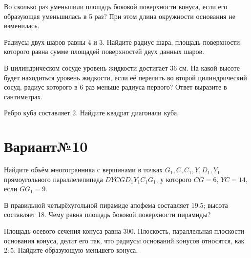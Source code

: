 \documentclass[4apaper]{article}
\begin{document}
\begin{taskBN}{3}
Во сколько раз уменьшили площадь боковой поверхности конуса, если его образующая уменьшилась в 5 раз? При этом длина окружности основания не изменилась.
\end{taskBN}

\begin{taskBN}{4}
Радиусы двух шаров равны $4$ и $3$. Найдите радиус шара, площадь поверхности которого равна сумме площадей поверхностей двух данных шаров.
\end{taskBN}

\begin{taskBN}{5}
В цилиндрическом сосуде уровень жидкости достигает 36 см. На какой высоте будет находиться уровень жидкости, если её перелить во второй цилиндрический сосуд, радиус которого в 6 раз меньше радиуса первого? Ответ выразите в сантиметрах.
\end{taskBN}

\begin{taskBN}{6}
Ребро куба составляет 2. Найдите квадрат диагонали куба.
\end{taskBN}
\newpage\section*{Вариант№10}

\begin{taskBN}{1}
Найдите объём многогранника с вершинами в точках $G_1,C,C_1,Y,D_1,Y_1$ прямоугольного параллелепипеда $DYCGD_1Y_1C_1G_1$, у которого $CG = 6$, $YC = 14$, если $GG_1=9$. 
\end{taskBN}

\begin{taskBN}{2}
В правильной четырёхугольной пирамиде апофема составляет 19.5; высота составляет 18. Чему равна площадь боковой поверхности пирамиды?
\end{taskBN}

\begin{taskBN}{3}
Площадь осевого сечения конуса равна $300$. Плоскость, параллельная плоскости основания конуса,  делит его так, что радиусы оснований конусов относятся, как $2:5$. Найдите образующую меньшего конуса. 
\end{taskBN}
\end{document}
